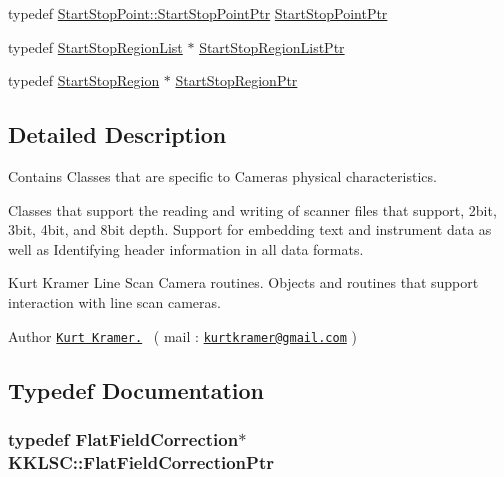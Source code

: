 \begin{DoxyCompactItemize}
\item 
typedef \hyperlink{class_k_k_l_s_c_1_1_start_stop_point_afcbbf85be8f397421049c64a12dec7a3}{Start\+Stop\+Point\+::\+Start\+Stop\+Point\+Ptr} \hyperlink{namespace_k_k_l_s_c_ad7242c9e21790e237095cdd24ce21361}{Start\+Stop\+Point\+Ptr}
\item 
typedef \hyperlink{class_k_k_l_s_c_1_1_start_stop_region_list}{Start\+Stop\+Region\+List} $\ast$ \hyperlink{namespace_k_k_l_s_c_a3ed8c41747a01b144f71fafbc42f2b19}{Start\+Stop\+Region\+List\+Ptr}
\item 
typedef \hyperlink{class_k_k_l_s_c_1_1_start_stop_region}{Start\+Stop\+Region} $\ast$ \hyperlink{namespace_k_k_l_s_c_ab8d461b98323a176ed761955cd9547c0}{Start\+Stop\+Region\+Ptr}
\end{DoxyCompactItemize}


\subsection{Detailed Description}
Contains Classes that are specific to Cameras physical characteristics. 

Classes that support the reading and writing of scanner files that support, 2bit, 3bit, 4bit, and 8bit depth. Support for embedding text and instrument data as well as Identifying header information in all data formats.

Kurt Kramer Line Scan Camera routines. Objects and routines that support interaction with line scan cameras. \begin{DoxyParagraph}{Author }
\href{}{\tt Kurt Kramer.}~\newline
 ( mail \+: \href{mailto:kurtkramer@gmail.com}{\tt kurtkramer@gmail.\+com} )~\newline
 
\end{DoxyParagraph}


\subsection{Typedef Documentation}
\subsubsection[{\texorpdfstring{Flat\+Field\+Correction\+Ptr}{FlatFieldCorrectionPtr}}]{\setlength{\rightskip}{0pt plus 5cm}typedef {\bf Flat\+Field\+Correction}$\ast$ {\bf K\+K\+L\+S\+C\+::\+Flat\+Field\+Correction\+Ptr}}\hypertarget{namespace_k_k_l_s_c_a88efa04aa3b2fed1f7644ad1cc352233}{}\label{namespace_k_k_l_s_c_a88efa04aa3b2fed1f7644ad1cc352233}


